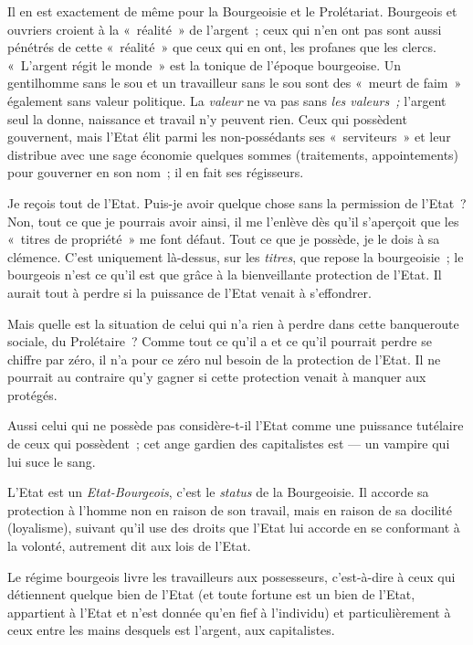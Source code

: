 \documentclass[french,twoside]{book} %
\begin{document}
Il en est exactement de même pour la Bourgeoisie et le Prolétariat. Bourgeois et ouvriers croient à la « réalité » de l’argent ; ceux qui n’en ont pas sont aussi pénétrés de cette « réalité » que ceux qui en ont, les profanes que les clercs. « L’argent régit le monde » est la tonique de l’époque bourgeoise. Un gentilhomme sans le sou et un travailleur sans le sou sont des « meurt de faim » également sans valeur politique. La \emph{valeur} ne va pas sans \emph{les valeurs ;} l’argent seul la donne, naissance et travail n’y peuvent rien. Ceux qui possèdent gouvernent, mais l’Etat élit parmi les non-possédants ses « serviteurs » et leur distribue avec une sage économie quelques sommes (traitements, appointements) pour gouverner en son nom ; il en fait ses régisseurs.\par
Je reçois tout de l’Etat. Puis-je avoir quelque chose sans la permission de l’Etat ? Non, tout ce que je pourrais avoir ainsi, il me l’enlève dès qu’il s’aperçoit que les « titres de propriété » me font défaut. Tout ce que je possède, je le dois à sa clémence. C’est uniquement là-dessus, sur les \emph{titres}, que repose la bourgeoisie ; le bourgeois n’est ce qu’il est que grâce à la bienveillante protection de l’Etat. Il aurait tout à perdre si la puissance de l’Etat venait à s’effondrer.\par
Mais quelle est la situation de celui qui n’a rien à perdre dans cette banqueroute sociale, du Prolétaire ? Comme tout ce qu’il a et ce qu’il pourrait perdre se chiffre par zéro, il n’a pour ce zéro nul besoin de la protection de l’Etat. Il ne pourrait au contraire qu’y gagner si cette protection venait à manquer aux protégés.\par
 Aussi celui qui ne possède pas considère-t-il l’Etat comme une puissance tutélaire de ceux qui possèdent ; cet ange gardien des capitalistes est — un vampire qui lui suce le sang.\par
L’Etat est un \emph{Etat-Bourgeois}, c’est le \emph{status} de la Bourgeoisie. Il accorde sa protection à l’homme non en raison de son travail, mais en raison de sa docilité (loyalisme), suivant qu’il use des droits que l’Etat lui accorde en se conformant à la volonté, autrement dit aux lois de l’Etat.\par
Le régime bourgeois livre les travailleurs aux possesseurs, c’est-à-dire à ceux qui détiennent quelque bien de l’Etat (et toute fortune est un bien de l’Etat, appartient à l’Etat et n’est donnée qu’en fief à l’individu) et particulièrement à ceux entre les mains desquels est l’argent, aux capitalistes.\par
\end{document}
